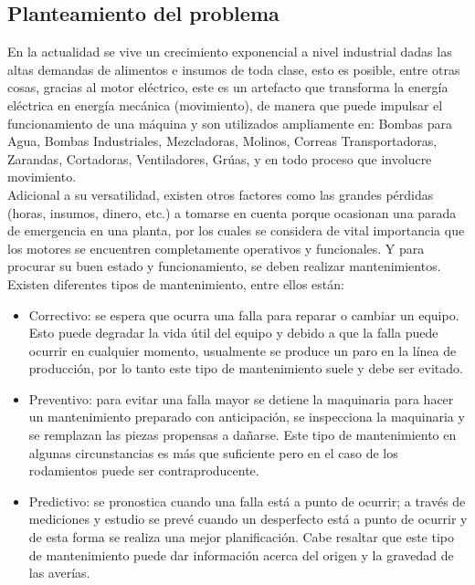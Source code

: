 \setcounter{page}{1}

\begin{center}
	\section{Planteamiento del problema}
\end{center}



	En la actualidad se vive un crecimiento exponencial a nivel industrial dadas las altas demandas de alimentos e insumos de toda clase, esto es posible, entre otras cosas, gracias al motor eléctrico, este es un artefacto que transforma la energía eléctrica en energía mecánica (movimiento), de manera que puede impulsar el funcionamiento de una máquina y son utilizados ampliamente en: Bombas para Agua, Bombas Industriales, Mezcladoras, Molinos, Correas Transportadoras, Zarandas, Cortadoras, Ventiladores, Grúas, y en todo proceso que involucre movimiento.\\


	Adicional a su versatilidad, existen otros factores como las grandes pérdidas (horas, insumos, dinero, etc.) a tomarse en cuenta porque ocasionan una parada de emergencia en una planta, por los cuales se considera de vital importancia que los motores se encuentren completamente operativos y funcionales. Y para procurar su buen estado y funcionamiento, se deben realizar mantenimientos.\\



	Existen diferentes tipos de mantenimiento, entre ellos están:
	\begin{itemize}
		\item Correctivo: se espera que ocurra una falla para reparar o cambiar un equipo. Esto puede degradar la vida útil del equipo y debido a que la falla puede ocurrir en cualquier momento, usualmente se produce un paro en la línea de producción, por lo tanto este tipo de mantenimiento suele y debe ser evitado.

		\item Preventivo: para evitar una falla mayor se detiene la maquinaria para hacer un mantenimiento preparado con anticipación, se inspecciona la maquinaria y se remplazan las piezas propensas a dañarse. Este tipo de mantenimiento en algunas circunstancias es más que suficiente pero en el caso de los rodamientos puede ser contraproducente.

		\item Predictivo: se pronostica cuando una falla está a punto de ocurrir; a través de mediciones y estudio se prevé cuando un desperfecto está a punto de ocurrir y de esta forma se realiza una mejor planificación. Cabe resaltar que este tipo de mantenimiento puede dar información acerca del origen y la gravedad de las averías.
	\end{itemize}


